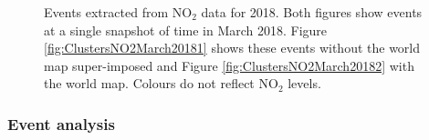 \documentclass[a4paper,11pt]{article}
\begin{document}
\begin{figure}[H]
	\centering
	\caption{\footnotesize Events extracted from $\text{NO}_2$ data for 2018. Both figures show events at a single snapshot of time in March 2018. Figure \ref{fig:ClustersNO2March20181} shows these events without the world map super-imposed and Figure \ref{fig:ClustersNO2March20182} with the world map. Colours do not reflect $\text{NO}_2$ levels.}
	\label{fig:ClustersNO2March2018}
\end{figure}

\subsubsection{Event analysis}
\end{document}

